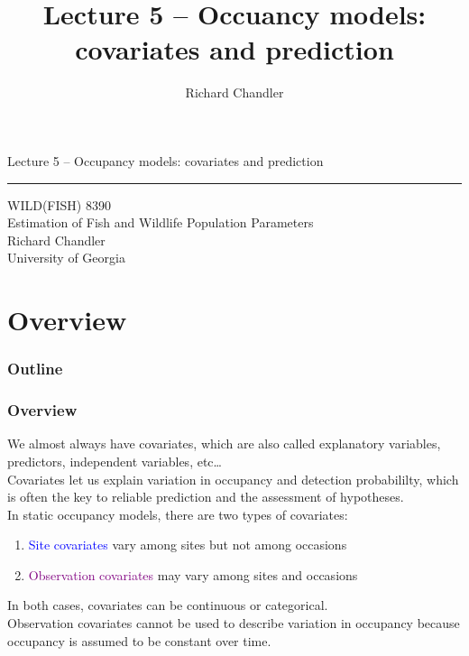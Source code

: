 \documentclass[color=usenames,dvipsnames]{beamer}\usepackage[]{graphicx}\usepackage[]{color}
\title{Lecture 5 -- Occuancy models: covariates and prediction }
\author{Richard Chandler}
\begin{document}
\begin{frame}[plain]
  \LARGE
  \centering
  {\huge Lecture 5 -- Occupancy models: covariates and prediction} \\
  {\color{default} \rule{\textwidth}{0.1pt}}
  \vfill
  \large
  WILD(FISH) 8390 \\
  Estimation of Fish and Wildlife Population Parameters \\
  \vfill
  \large
  Richard Chandler \\
  University of Georgia \\
\end{frame}






\section{Overview}



\begin{frame}[plain]
  \frametitle{Outline}
  \Large
\end{frame}



\begin{frame}
  \frametitle{Overview}
  We almost always have covariates, which are also called explanatory
  variables, predictors, independent variables, etc\dots \\
  \pause
  \vfill
  Covariates let us explain variation in occupancy and detection
  probabililty, which is often the key to reliable prediction and the
  assessment of hypotheses. \\
  \pause
  \vfill
  In static occupancy models, there are two types of covariates:
  \begin{enumerate}
    \item \textcolor{blue}{Site covariates} vary among sites
      but not among occasions
    \item \textcolor{purple}{Observation covariates} may vary among
      sites and occasions
  \end{enumerate}
  \pause
  \vfill
  In both cases, covariates can be continuous or categorical. \\
  \pause
  \vfill
  Observation covariates cannot be used to describe variation in
  occupancy because occupancy is assumed to be constant over time.
\end{frame}
\end{document}
